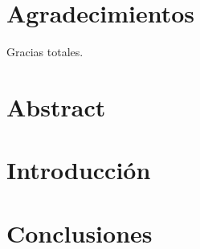 \documentclass[11pt]{book}
\begin{document}

\chapter*{Agradecimientos}

Gracias totales.



\tableofcontents


\chapter*{Abstract}
\thispagestyle{empty}

\chapter*{Introducción}
\thispagestyle{empty}

\mainmatter %
\pagestyle{headings}



\thispagestyle{empty}


\thispagestyle{empty}


\thispagestyle{empty}


\thispagestyle{empty}

\chapter*{Conclusiones}
\thispagestyle{empty}


\end{document}
